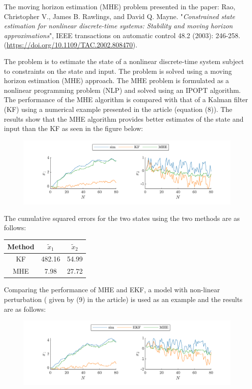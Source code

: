 
The moving horizon estimation (MHE) problem presented in the paper: Rao, Christopher V., James B. Rawlings, and David Q. Mayne. "\emph{Constrained state estimation for nonlinear discrete-time systems: Stability and moving horizon approximations}", IEEE transactions on automatic control 48.2 (2003): 246-258. (\url{https://doi.org/10.1109/TAC.2002.808470}). 

The problem is to estimate the state of a nonlinear discrete-time system subject to constraints on the state and input. The problem is solved using a moving horizon estimation (MHE) approach. The MHE problem is formulated as a nonlinear programming problem (NLP) and solved using an IPOPT algorithm. The performance of the MHE algorithm is compared with that of a Kalman filter (KF) using a numerical example presented in the article (equation (8)). The results show that the MHE algorithm provides better estimates of the state and input than the KF as seen in the figure below: 
\begin{figure}[!h]
    \centering
    \includegraphics{figures/ex5_MHE.pdf}
\end{figure}

The cumulative squared errors for the two states using the two methods are as follows:
\begin{table}[!h]
    \centering
    \begin{tabular}{c|c|c}
        Method & $\tilde x_1$ & $\tilde x_2$ \\
        \hline 
        KF & 482.16 & 54.99 \\
        MHE & 7.98 & 27.72
    \end{tabular}
\end{table}

\clearpage
Comparing the performance of MHE and EKF, a model with non-linear perturbation ( given by (9) in the article) is used as an example and the results are as follows: 
\begin{figure}[!h]
    \centering
    \includegraphics{figures/ex5_MHE_EKF.pdf}
\end{figure}

